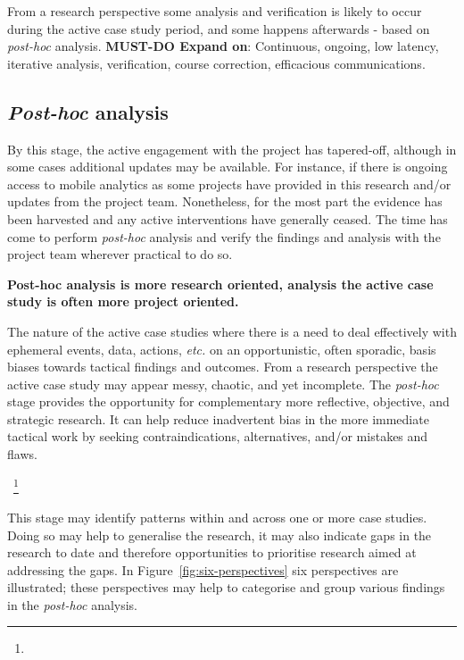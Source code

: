 
From a research perspective some analysis and verification is likely to occur during the active case study period, and some happens afterwards - based on \emph{post-hoc} analysis. \textbf{MUST-DO Expand on}: Continuous, ongoing, low latency, iterative analysis, verification, course correction, efficacious communications. 

\subsection{\emph{Post-hoc} analysis}
By this stage, the active engagement with the project has tapered-off, although in some cases additional updates may be available. For instance, if there is ongoing access to mobile analytics as some projects have provided in this research and/or updates from the project team. Nonetheless, for the most part the evidence has been harvested and any active interventions have generally ceased. The time has come to perform \emph{post-hoc} analysis and verify the findings and analysis with the project team wherever practical to do so. 

\textbf{Post-hoc analysis is more research oriented, analysis the active case study is often more project oriented.} 

The nature of the active case studies where there is a need to deal effectively with ephemeral events, data, actions, \textit{etc.} on an opportunistic, often sporadic, basis biases towards tactical findings and outcomes. From a research perspective the active case study may appear messy, chaotic, and yet incomplete. 
The \textit{post-hoc} stage provides the opportunity for complementary more reflective, objective, and strategic research. It can help reduce inadvertent bias in the more immediate tactical work by seeking contraindications, alternatives, and/or mistakes and flaws.

~\footnote{}

This stage may identify patterns within and across one or more case studies. Doing so may help to generalise the research, it may also indicate gaps in the research to date and therefore opportunities to prioritise research aimed at addressing the gaps.
In Figure~\ref{fig:six-perspectives} six perspectives are illustrated; these perspectives may help to categorise and group various findings in the \textit{post-hoc} analysis. 

